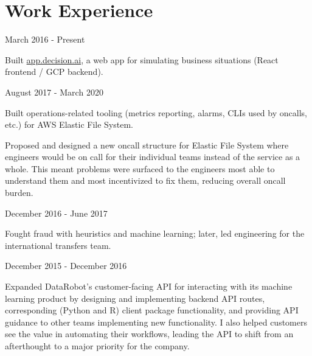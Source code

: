 \documentclass[letterpaper]{resume}
\author{David J. Chudzicki}
\begin{document}
\maketitle

\section{Work Experience}

{March 2016 - Present}


\begin{compactitem}
\item Built \href{https://app.decision.ai}{app.decision.ai}, a web app for simulating business situations (React frontend / GCP backend).
\end{compactitem}


{August 2017 - March 2020}


\begin{compactitem}
\item Built operations-related tooling (metrics reporting, alarms, CLIs used by oncalls, etc.) for AWS Elastic File System.
\item Proposed and designed a new oncall structure for Elastic File System where engineers would be on call for their individual teams instead of the service as a whole. This meant problems were surfaced to the engineers most able to understand them and most incentivized to fix them, reducing overall oncall burden.
\end{compactitem}


{December 2016 - June 2017}


\begin{compactitem}
\item Fought fraud with heuristics and machine learning; later, led engineering for the international transfers team.
\end{compactitem}



{December 2015 - December 2016}


\begin{compactitem}
\item Expanded DataRobot's customer-facing API for interacting with its machine learning product by designing and implementing backend API routes, corresponding (Python and R) client package functionality, and providing API guidance to other teams implementing new functionality. I also helped customers see the value in automating their workflows, leading the API to shift from an afterthought to a major priority for the company.
\end{compactitem}
\end{document}
